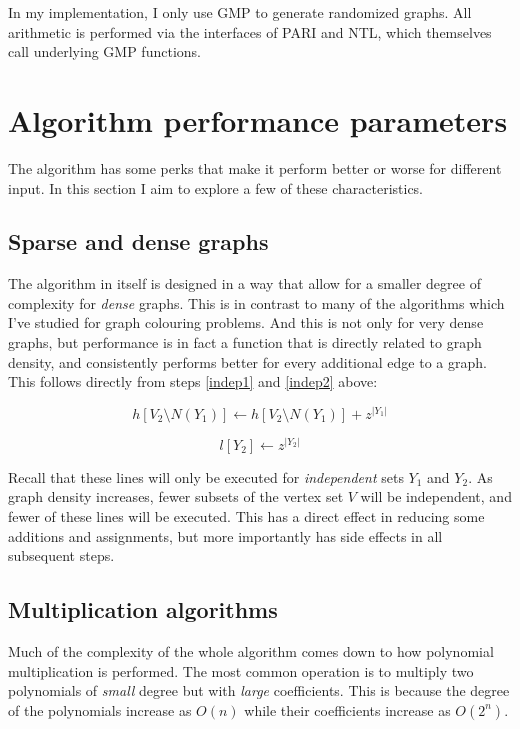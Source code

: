 \documentclass[a4paper]{article}
\begin{document}
In my implementation, I only use GMP to generate randomized graphs. All arithmetic is performed via the interfaces of PARI and NTL, which themselves call underlying GMP functions.

\section{Algorithm performance parameters}
The algorithm has some perks that make it perform better or worse for different input. In this section I aim to explore a few of these characteristics.

\subsection{Sparse and dense graphs}\label{sparsedense}
The algorithm in itself is designed in a way that allow for a smaller degree of complexity for \emph{dense} graphs. This is in contrast to many of the algorithms which I've studied for graph colouring problems. And this is not only for very dense graphs, but performance is in fact a function that is directly related to graph density, and consistently performs better for every additional edge to a graph. This follows directly from steps \ref{indep1} and \ref{indep2} above:

$$ h[V_2 \setminus N(Y_1)] \leftarrow h[V_2 \setminus N(Y_1)] + z^{|Y_1|} $$

$$ l[Y_2] \leftarrow z^{|Y_2|} $$

Recall that these lines will only be executed for \emph{independent} sets $Y_1$ and $Y_2$. As graph density increases, fewer subsets of the vertex set $V$ will be independent, and fewer of these lines will be executed. This has a direct effect in reducing some additions and assignments, but more importantly has side effects in all subsequent steps. 


\subsection{Multiplication algorithms}
Much of the complexity of the whole algorithm comes down to how polynomial multiplication is performed. The most common operation is to multiply two polynomials of \emph{small} degree but with \emph{large} coefficients. This is because the degree of the polynomials increase as $O(n)$ while their coefficients increase as $O(2^n)$. %
\end{document}
